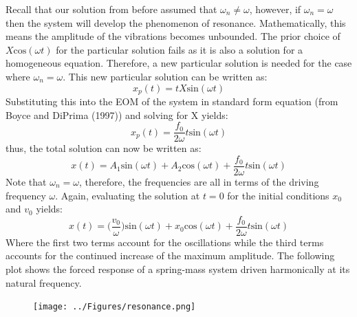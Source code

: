\documentclass[12pt,letter]{article}
\numberwithin{ex}{section} %
\numberwithin{re}{section} %
\begin{document}
			Recall that our solution from before assumed that $\omega_n \neq \omega$, however, if $\omega_n = \omega$ then the system will develop the phenomenon of resonance. Mathematically, this means the amplitude of the vibrations becomes unbounded. The prior choice of $X\text{cos}(\omega t)$ for the particular solution fails as it is also a solution for a homogeneous equation. Therefore, a new particular solution is needed for the case where $\omega_n = \omega$. This new particular solution can be written as:
			\begin{equation}
				x_p(t) = t X\text{sin}(\omega t)
			\end{equation}				
			Substituting this into the EOM of the system in standard form equation (from Boyce and DiPrima (1997)) and solving for X yields:
			\begin{equation}
				x_p(t) = \frac{f_0}{2 \omega} t \text{sin}(\omega t)
			\end{equation}	
			thus, the total solution can now be written as:
			\begin{equation}
				x(t) = A_1\text{sin}(\omega t) + A_2\text{cos}(\omega t) + \frac{f_0}{2 \omega} t \text{sin}(\omega t)
			\end{equation}			
			Note that $\omega_n=\omega$, therefore, the frequencies are all in terms of the driving frequency $\omega$. Again, evaluating the solution at $t=0$ for the initial conditions $x_0$ and $v_0$ yields:
			\begin{equation}
				x(t) = \Big(\frac{v_0}{\omega}\Big)\text{sin}(\omega t) + x_0\text{cos}(\omega t) + \frac{f_0}{2 \omega} t \text{sin}(\omega t)
			\end{equation}			
			Where the first two terms account for the oscillations while the third terms accounts for the continued increase of the maximum amplitude. The following plot shows the forced response of a spring-mass system driven harmonically at its natural frequency.
			\begin{figure}[H]
				\centering
				\texttt{[image: ../Figures/resonance.png]}
			\end{figure}				
\end{document}
